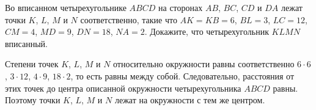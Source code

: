 \problem
Во вписанном четырехугольнике $ABCD$ на сторонах $AB$, $BC$, $CD$ и $DA$ лежат
точки $K$, $L$, $M$ и $N$ соответственно, такие что $AK = KB = 6$, $BL = 3$,
$LC = 12$, $CM = 4$, $MD = 9$, $DN = 18$, $NA = 2$.
Докажите, что четырехугольник $KLMN$ вписанный.

\solution
Степени точек $K$, $L$, $M$ и $N$ относительно окружности равны соответственно
$6 \cdot 6$, $3 \cdot 12$, $4 \cdot 9$, $18 \cdot 2$, то есть равны между
собой.
Следовательно, расстояния от этих точек до центра описанной окружности
четырехугольника $ABCD$ равны.
Поэтому точки $K$, $L$, $M$ и $N$ лежат на окружности с тем же центром.
\endproblem
